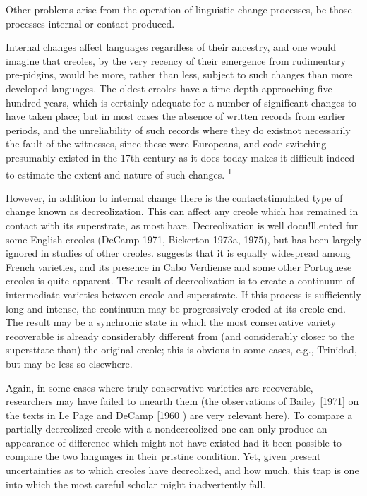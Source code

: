 Other problems arise from the operation of linguistic change processes, be those processes internal or contact produced.

Internal changes affect languages regardless of their ancestry, and one would imagine that creoles, by the very recency of their emergence from rudimentary pre-pidgins, would be more, rather than less, subject to such changes than more developed languages. The oldest creoles have a time depth approaching five hundred years, which is certainly adequate for a number of significant changes to have taken place; but in most cases the absence of written records from earlier periods, and the unreliability of such records where they do exist\-not necessarily the fault of the witnesses, since these were Europeans, and code-switching presumably existed in the 17th century as it does today-makes it difficult indeed to estimate the extent and nature of such changes. \textsuperscript{1}

However, in addition to internal change there is the contact\-stimulated type of change known as decreolization. This can affect any creole which has remained in contact with its superstrate, as most have. Decreolization is well docu!ll,ented fur some English creoles
(DeCamp 1971, Bickerton 1973a, 1975), but has been largely ignored in studies of other creoles. \citet{Valdman1973} suggests that it is equally widespread among French varieties, and its presence in Cabo Verdiense and some other Portuguese creoles is quite apparent. The result of decreolization is to create a continuum of intermediate varieties be\-tween creole and superstrate. If this process is sufficiently long and intense, the continuum may be progressively eroded at its creole end. The result may be a synchronic state in which the most conservative variety recoverable is already considerably different from (and con\-siderably closer to the supersttate than) the original creole; this is obvious in some cases, e.g., Trinidad, but may be less so elsewhere.

Again, in some cases where truly conservative varieties are recoverable, researchers may have failed to unearth them (the obser\-vations of Bailey [1971] on the texts in Le Page and DeCamp [1960 ) are very relevant here). To compare a partially decreolized creole with a nondecreolized one can only produce an appearance of difference which might not have existed had it been possible to compare the two languages in their pristine condition. Yet, given present uncertainties as to which creoles have decreolized, and how much, this trap is one into which the most careful scholar might inadvertently fall.

